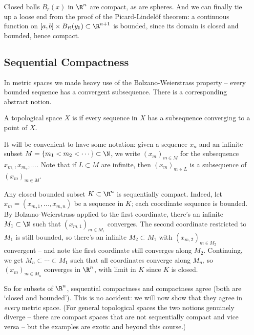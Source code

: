 \begin{example}
    Closed balls $B_r(x)$ in $\R^n$ are compact, as are spheres. And we can finally tie up a loose end from the proof of the Picard-Lindel\"of theorem: a continuous function on $[a, b] \times B_R(y_0) \subset \R^{n+1}$ is bounded, since its domain is closed and bounded, hence compact.
\end{example}

\subsection{Sequential Compactness}

In metric spaces we made heavy use of the Bolzano-Weierstrass property -- every bounded sequence has a convergent subsequence. There is a corresponding abstract notion.

\begin{definition}
    A topological space $X$ is  if every sequence in $X$ has a subsequence converging to a point of $X$.
\end{definition}

It will be convenient to have some notation: given a sequence $x_n$ and an infinite subset $M = \{m_1 < m_2 < \cdots\} \subset \N$, we write $(x_m)_{m \in M}$ for the subsequence $x_{m_1}, x_{m_2}, \dots$. Note that if $L \subset M$ are infinite, then $(x_m)_{m \in L}$ is a subsequence of $(x_m)_{m \in M}$.

\begin{example}\label{ex:bwrn}
    Any closed bounded subset $K \subset \R^n$ is sequentially compact. Indeed, let $x_m = (x_{m, 1}, \dots, x_{m, n})$ be a sequence in $K$; each coordinate sequence is bounded. By Bolzano-Weierstrass applied to the first coordinate, there's an infinite $M_1 \subset \N$ such that $(x_{m, 1})_{m \in M_1}$ converges. The second coordinate restricted to $M_1$ is still bounded, so there's an infinite $M_2 \subset M_1$ with $(x_{m, 2})_{m \in M_2}$ convergent -- and note the first coordinate still converges along $M_2$. Continuing, we get $M_n \subset \cdots \subset M_1$ such that all coordinates converge along $M_n$, so $(x_m)_{m \in M_n}$ converges in $\R^n$, with limit in $K$ since $K$ is closed.
\end{example}

So for subsets of $\R^n$, sequential compactness and compactness agree (both are `closed and bounded'). This is no accident: we will now show that they agree in \emph{every} metric space. (For general topological spaces the two notions genuinely diverge -- there are compact spaces that are not sequentially compact and vice versa -- but the examples are exotic and beyond this course.)

